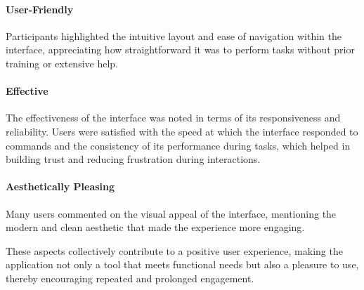 \paragraph{User-Friendly} 
Participants highlighted the intuitive layout and ease of navigation within the interface, appreciating how straightforward it was to perform tasks without prior training or extensive help. 
\cite{P1, P2, P4, P5, P7, P8, P10}

 
\paragraph{Effective} 
The effectiveness of the interface was noted in terms of its responsiveness and reliability. 
Users were satisfied with the speed at which the interface responded to commands and the consistency of its performance during tasks, which helped in building trust and reducing frustration during interactions.
\cite{P2, P4, P7, P8, P10}



\paragraph{Aesthetically Pleasing} 
Many users commented on the visual appeal of the interface, mentioning the modern and clean aesthetic that made the experience more engaging. 
\cite{P7, P8, P10}


These aspects collectively contribute to a positive user experience, making the application not only a tool that meets functional needs but also a pleasure to use, thereby encouraging repeated and prolonged engagement.

